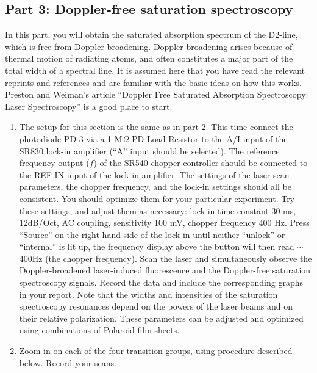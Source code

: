 \documentclass{../lab}
\begin{document}


\subsection{Part 3: Doppler-free saturation spectroscopy}

In this part, you will obtain the saturated absorption spectrum of the D2-line, which is free from Doppler broadening. Doppler broadening arises because of thermal motion of radiating atoms, and often constitutes a major part of the total width of a spectral line. It is assumed here that you have read the relevant reprints and references and are familiar with the basic ideas on how this works. Preston and Weiman's article ``Doppler Free Saturated Absorption Spectroscopy: Laser Spectroscopy'' is a good place to start.

\begin{enumerate}
    \item The setup for this section is the same as in part 2. This time connect the photodiode PD-3 via a 1 M$\Omega$ PD Load Resistor to the A/I input of the SR830 lock-in amplifier (``A'' input should be selected). The reference frequency output ($f$) of the SR540 chopper controller should be connected to the REF IN input of the lock-in amplifier. The settings of the laser scan parameters, the chopper frequency, and the lock-in settings should all be consistent. You should optimize them for your particular experiment. Try these settings, and adjust them as necessary: lock-in time constant 30 ms, 12dB/Oct, AC coupling, sensitivity 100 mV, chopper frequency 400 Hz. Press ``Source'' on the right-hand-side of the lock-in until neither ``unlock'' or ``internal'' is lit up, the frequency display above the button will then read $\sim$400Hz (the chopper frequency). Scan the laser and simultaneously observe the Doppler-broadened laser-induced fluorescence and the Doppler-free saturation spectroscopy signals. Record the data and include the corresponding graphs in your report. Note that the widths and intensities of the saturation spectroscopy resonances depend on the powers of the laser beams and on their relative polarization. These parameters can be adjusted and optimized using combinations of Polaroid film sheets.

    \item Zoom in on each of the four transition groups, using procedure described below. Record your scans.

\end{enumerate}
\end{document}
